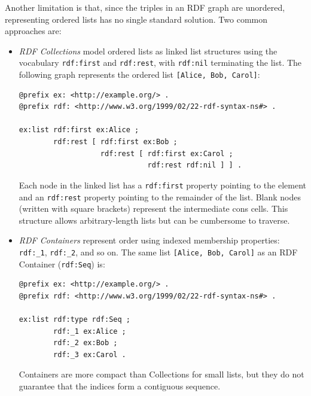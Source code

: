 Another limitation is that, since the triples in an RDF graph are unordered, representing ordered lists has no single standard solution. Two common approaches are: 

\begin{itemize}
    \item \emph{RDF Collections} model ordered lists as linked list structures using the vocabulary \texttt{rdf:first} and \texttt{rdf:rest}, with \texttt{rdf:nil} terminating the list. The following graph represents the ordered list \texttt{[Alice, Bob, Carol]}:

\begin{lstlisting}[caption={RDF Collection for Alice, Bob, Carol}]
@prefix ex: <http://example.org/> .
@prefix rdf: <http://www.w3.org/1999/02/22-rdf-syntax-ns#> .

ex:list rdf:first ex:Alice ;
        rdf:rest [ rdf:first ex:Bob ;
                   rdf:rest [ rdf:first ex:Carol ;
                              rdf:rest rdf:nil ] ] .
\end{lstlisting}

    Each node in the linked list has a \texttt{rdf:first} property pointing to the element and an \texttt{rdf:rest} property pointing to the remainder of the list. Blank nodes (written with square brackets) represent the intermediate cons cells. This structure allows arbitrary-length lists but can be cumbersome to traverse.

    \item \emph{RDF Containers} represent order using indexed membership properties: \texttt{rdf:\_1}, \texttt{rdf:\_2}, and so on. The same list \texttt{[Alice, Bob, Carol]} as an RDF Container (\texttt{rdf:Seq}) is:

    \begin{lstlisting}[caption={RDF Container for Alice, Bob, Carol}]
@prefix ex: <http://example.org/> .
@prefix rdf: <http://www.w3.org/1999/02/22-rdf-syntax-ns#> .

ex:list rdf:type rdf:Seq ;
        rdf:_1 ex:Alice ;
        rdf:_2 ex:Bob ;
        rdf:_3 ex:Carol .
    \end{lstlisting}

    Containers are more compact than Collections for small lists, but they do not guarantee that the indices form a contiguous sequence.
\end{itemize}

